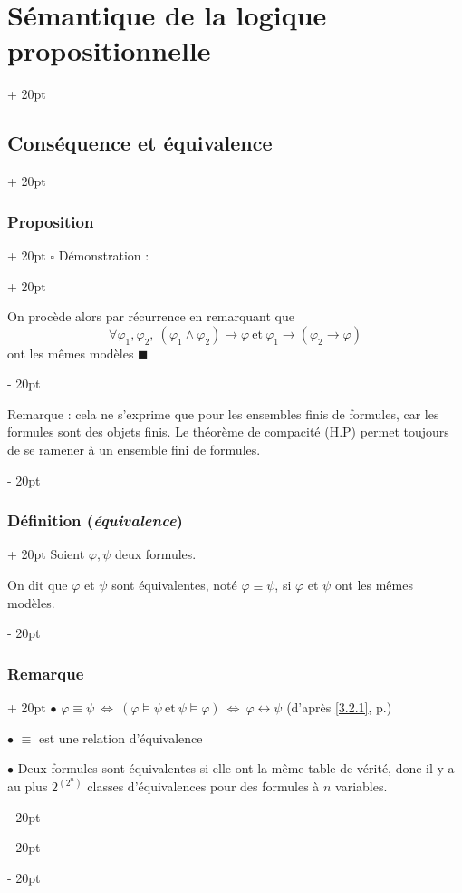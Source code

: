 \documentclass[a4paper, 12pt, twoside]{article}
\newcommand{\ssi}{\ \Leftrightarrow \ }
\newcommand{\ind}[1][20pt]{\advance\leftskip + #1}
\newcommand{\deind}[1][20pt]{\advance\leftskip - #1}
\newenvironment{indt}[2][20pt]{#2 \par \ind[#1]}{\par \deind} %
\begin{document}
\begin{indt}{\section{Sémantique de la logique propositionnelle}}
\begin{indt}{\subsection{Conséquence et équivalence}}
\begin{indt}{\subsubsection{Proposition}}
\begin{indt}{$\square$ Démonstration :}
                    \vspace{12pt}
                    
                    On procède alors par récurrence en remarquant que
                        \[ \forall \varphi_1, \varphi_2,\ (\varphi_1 \wedge \varphi_2) \rightarrow \varphi\ \text{et}\ \varphi_1 \rightarrow (\varphi_2 \rightarrow \varphi) \]
                    ont les mêmes modèles $\blacksquare$
                \end{indt}
                
                \vspace{12pt}
                
                Remarque : cela ne s'exprime que pour les ensembles finis de formules, car les formules sont des objets finis. Le théorème de compacité (H.P) permet toujours de se ramener à un ensemble fini de formules.
            \end{indt}
            
            \vspace{12pt}
            
            \begin{indt}{\subsubsection{Définition (\textit{équivalence})}}
                Soient $\varphi, \psi$ deux formules.
                
                On dit que $\varphi$ et $\psi$ sont équivalentes, noté $\varphi \equiv \psi$, si $\varphi$ et $\psi$ ont les mêmes modèles.
            \end{indt}
            
            \vspace{12pt}
            
            \begin{indt}{\subsubsection{Remarque}}
                $\bullet$ $\varphi \equiv \psi \ssi (\varphi \vDash \psi\ \text{et}\ \psi \vDash \varphi) \ssi \varphi \leftrightarrow \psi$ (d'après \ref{3.2.1}, p.\pageref{3.2.1})
                
                $\bullet$ $\equiv$ est une relation d'équivalence
                
                $\bullet$ Deux formules sont équivalentes si elle ont la même table de vérité, donc il y a au plus $2^{(2^n)}$ classes d'équivalences pour des formules à $n$ variables.
                

\end{indt}
\end{indt}
\end{indt}
\end{document}
